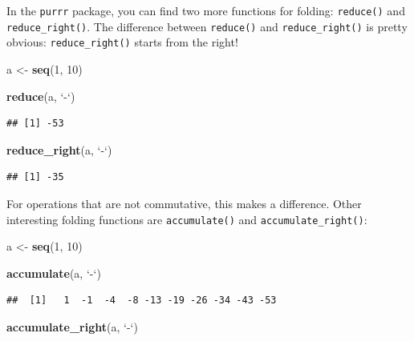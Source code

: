 \documentclass[]{gitbook}
\newenvironment{Shaded}{\begin{snugshade}}{\end{snugshade}}
\newcommand{\DataTypeTok}[1]{\textcolor[rgb]{0.13,0.29,0.53}{#1}}
\newcommand{\DecValTok}[1]{\textcolor[rgb]{0.00,0.00,0.81}{#1}}
\newcommand{\KeywordTok}[1]{\textcolor[rgb]{0.13,0.29,0.53}{\textbf{#1}}}
\newcommand{\NormalTok}[1]{#1}
\newcommand{\StringTok}[1]{\textcolor[rgb]{0.31,0.60,0.02}{#1}}
\theoremstyle{definition}
\theoremstyle{definition}
\theoremstyle{definition}
\theoremstyle{remark}
\begin{document}
In the \texttt{purrr} package, you can find two more functions for
folding: \texttt{reduce()} and \texttt{reduce\_right()}. The difference
between \texttt{reduce()} and \texttt{reduce\_right()} is pretty
obvious: \texttt{reduce\_right()} starts from the right!

\begin{Shaded}
\begin{Highlighting}[]
\NormalTok{a <-}\StringTok{ }\KeywordTok{seq}\NormalTok{(}\DecValTok{1}\NormalTok{, }\DecValTok{10}\NormalTok{)}

\KeywordTok{reduce}\NormalTok{(a, }\StringTok{`}\DataTypeTok{-}\StringTok{`}\NormalTok{)}
\end{Highlighting}
\end{Shaded}

\begin{verbatim}
## [1] -53
\end{verbatim}

\begin{Shaded}
\begin{Highlighting}[]
\KeywordTok{reduce_right}\NormalTok{(a, }\StringTok{`}\DataTypeTok{-}\StringTok{`}\NormalTok{)}
\end{Highlighting}
\end{Shaded}

\begin{verbatim}
## [1] -35
\end{verbatim}

For operations that are not commutative, this makes a difference. Other
interesting folding functions are \texttt{accumulate()} and
\texttt{accumulate\_right()}:

\begin{Shaded}
\begin{Highlighting}[]
\NormalTok{a <-}\StringTok{ }\KeywordTok{seq}\NormalTok{(}\DecValTok{1}\NormalTok{, }\DecValTok{10}\NormalTok{)}

\KeywordTok{accumulate}\NormalTok{(a, }\StringTok{`}\DataTypeTok{-}\StringTok{`}\NormalTok{)}
\end{Highlighting}
\end{Shaded}

\begin{verbatim}
##  [1]   1  -1  -4  -8 -13 -19 -26 -34 -43 -53
\end{verbatim}

\begin{Shaded}
\begin{Highlighting}[]
\KeywordTok{accumulate_right}\NormalTok{(a, }\StringTok{`}\DataTypeTok{-}\StringTok{`}\NormalTok{)}
\end{Highlighting}
\end{Shaded}
\end{document}
